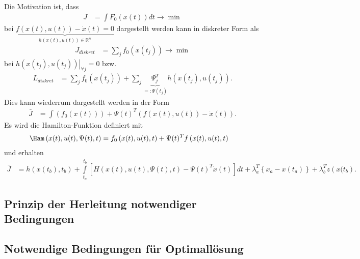 Die Motivation ist, dass 
\begin{align*}
	J & = \int F_0(x(t))dt \rightarrow \min
\end{align*}
bei $\underbrace{f\left(x(t), u(t) \right)-\dot{x}(t)=0 }_{h\left(x(t),u(t) \right)\in\mathbb{R}^n }$ dargestellt werden kann in diskreter Form als
\begin{align*}
	J_{diskret} & = \sum\limits_j f_0(x(t_j))\rightarrow \min 
\end{align*}
bei $\left. h\left(x(t_j),u(t_j) \right)\right|_{\forall j}=0$ bzw.
\begin{align*}
	L_{diskret} & = \sum\limits_j f_0(x(t_j)) + \sum\limits_j \underbrace{\Psi_j^T}_{=:\Psi(t_j)} h\left(x(t_j),u(t_j) \right).
\end{align*}
Dies kann wiederrum dargestellt werden in der Form
\begin{align*}
	\bar{J} & = \int\left(f_0(x(t)) \right) + \Psi(t)^T\left(f(x(t),u(t))-\dot{x}(t) \right).
\end{align*}
Es wird die Hamilton-Funktion definiert mit
\begin{align*}
	\Ham\left(x(t),u(t),\Psi(t),t \right) & = f_0\left(x(t),u(t),t \right) + \Psi(t)^T f\left(x(t),u(t),t \right)
\end{align*}
und erhalten 
\begin{align}
	\bar{J} & = h\left(x(t_b),t_b \right) + \int\limits_{t_a}^{t_b}\left[H\left(x(t),u(t),\Psi(t),t \right)-\Psi(t)^T\dot{x}(t) \right]dt
	+\lambda_a^T\left\{x_a-x(t_a) \right\} + \lambda_b^T z\left(x(t_b\right).
\end{align}


\subsection{Prinzip der Herleitung notwendiger Bedingungen}

\subsection{Notwendige Bedingungen für Optimallösung}

